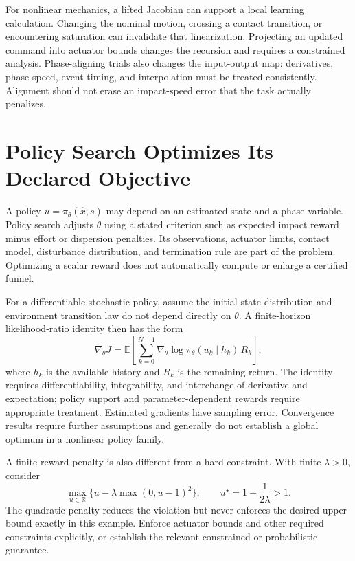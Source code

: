 For nonlinear mechanics, a lifted Jacobian can support a local learning calculation. Changing the nominal motion, crossing a contact transition, or encountering saturation can invalidate that linearization. Projecting an updated command into actuator bounds changes the recursion and requires a constrained analysis. Phase-aligning trials also changes the input-output map: derivatives, phase speed, event timing, and interpolation must be treated consistently. Alignment should not erase an impact-speed error that the task actually penalizes.

\section{Policy Search Optimizes Its Declared Objective}

A policy $u=\pi_\theta(\hat x,s)$ may depend on an estimated state and a phase variable. Policy search adjusts $\theta$ using a stated criterion such as expected impact reward minus effort or dispersion penalties. Its observations, actuator limits, contact model, disturbance distribution, and termination rule are part of the problem. Optimizing a scalar reward does not automatically compute or enlarge a certified funnel.

For a differentiable stochastic policy, assume the initial-state distribution and environment transition law do not depend directly on $\theta$. A finite-horizon likelihood-ratio identity then has the form
\begin{equation}
\nabla_\theta J
=\mathbb E\!\left[\sum_{k=0}^{N-1}
\nabla_\theta\log\pi_\theta(u_k\mid h_k)\,R_k\right],
\end{equation}
where $h_k$ is the available history and $R_k$ is the remaining return. The identity requires differentiability, integrability, and interchange of derivative and expectation; policy support and parameter-dependent rewards require appropriate treatment. Estimated gradients have sampling error. Convergence results require further assumptions and generally do not establish a global optimum in a nonlinear policy family.

A finite reward penalty is also different from a hard constraint. With finite $\lambda>0$, consider
\begin{equation}
\max_{u\in\mathbb R}\{u-\lambda\max(0,u-1)^2\},\qquad
u^\star=1+\frac{1}{2\lambda}>1 .
\end{equation}
The quadratic penalty reduces the violation but never enforces the desired upper bound exactly in this example. Enforce actuator bounds and other required constraints explicitly, or establish the relevant constrained or probabilistic guarantee.

